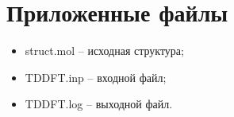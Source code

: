 \section{Приложенные файлы}
\begin{itemize}
    \item struct.mol – исходная структура;
    \item TDDFT.inp – входной файл;
    \item TDDFT.log – выходной файл.
\end{itemize}{}